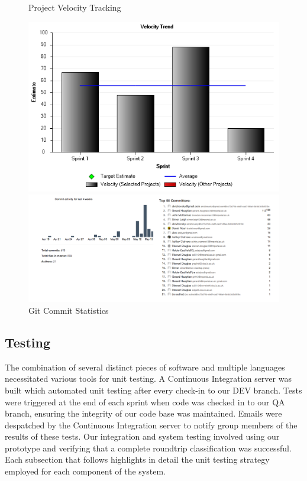 \documentclass[a4paper,11pt]{article}
\begin{document}
\begin{figure}[htb!]
	\centering
	\caption{Project Velocity Tracking}
	\includegraphics[width=0.80\linewidth]{images/VelocityTrend.png}
	\caption{Git Commit Statistics}
		\includegraphics[width=0.80\linewidth]{images/GitCommits.png}

\end{figure}
\clearpage

\subsection{Testing}

The combination of several distinct pieces of software and multiple languages necessitated various tools for unit testing. A Continuous Integration server was built which automated unit testing after every check-in to our DEV branch. Tests were triggered at the end of each sprint when code was checked in to our QA branch, ensuring the integrity of our code base was maintained. Emails were despatched by the Continuous Integration server to notify group members of the results of these tests. Our integration and system testing involved using our prototype and verifying that a complete roundtrip classification was successful. Each subsection that follows highlights in detail the unit testing strategy employed for each component of the system. 
\end{document}
